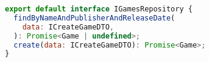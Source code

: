\begin{lstlisting}[language=JavaScript, caption={A interface IGamesRepository},captionpos=b, label=alg:igamerepository]
export default interface IGamesRepository {
  findByNameAndPublisherAndReleaseDate(
    data: ICreateGameDTO,
  ): Promise<Game | undefined>;
  create(data: ICreateGameDTO): Promise<Game>;
}
  
\end{lstlisting}